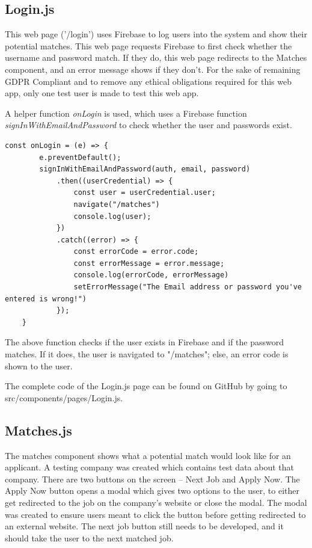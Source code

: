 \subsection{Login.js}
This web page ('/login') uses Firebase to log users into the system and show their potential matches. This web page requests Firebase to first check whether the username and password match. If they do, this web page redirects to the Matches component, and an error message shows if they don't. For the sake of remaining GDPR Compliant and to remove any ethical obligations required for this web app, only one test user is made to test this web app. 

A helper function \textit{onLogin} is used, which uses a Firebase function \textit{signInWithEmailAndPassword} to check whether the user and passwords exist. 

\begin{lstlisting}
const onLogin = (e) => {
        e.preventDefault();
        signInWithEmailAndPassword(auth, email, password)
            .then((userCredential) => {
                const user = userCredential.user;
                navigate("/matches")
                console.log(user);
            })
            .catch((error) => {
                const errorCode = error.code;
                const errorMessage = error.message;
                console.log(errorCode, errorMessage)
                setErrorMessage("The Email address or password you've entered is wrong!")
            });
    }
\end{lstlisting}

The above function checks if the user exists in Firebase and if the password matches. If it does, the user is navigated to "/matches"; else, an error code is shown to the user.


The complete code of the Login.js page can be found on GitHub by going to src/components/pages/Login.js.

\subsection{Matches.js}
The matches component shows what a potential match would look like for an applicant. A testing company was created which contains test data about that company. There are two buttons on the screen -- Next Job and Apply Now. The Apply Now button opens a modal which gives two options to the user, to either get redirected to the job on the company's website or close the modal. The modal was created to ensure users meant to click the button before getting redirected to an external website. The next job button still needs to be developed, and it should take the user to the next matched job. 

